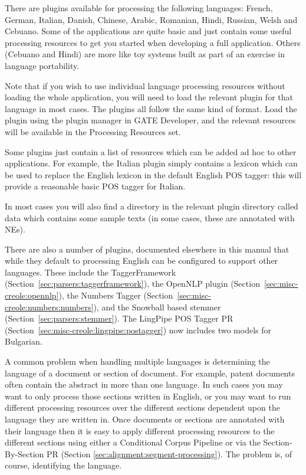 
\nnormalsize

There are plugins available for processing the following languages:
French, German, Italian, Danish, Chinese, Arabic, Romanian, Hindi, Russian,
Welsh and Cebuano. Some of the applications are quite basic and just contain
some useful processing resources to get you started when developing a full
application. Others (Cebuano and Hindi) are more like toy systems built as
part of an exercise in language portability.

Note that if you wish to use individual language processing resources
without loading the whole application, you will need to load the
relevant plugin for that language in most cases. The plugins all
follow the same kind of format. Load the plugin using the plugin
manager in GATE Developer, and the relevant resources will be
available in the Processing Resources set.

Some plugins just contain a list of resources which can be added ad
hoc to other applications. For example, the Italian plugin simply
contains a lexicon which can be used to replace the English lexicon in
the default English POS tagger: this will provide a reasonable basic
POS tagger for Italian.

In most cases you will also find a directory in the relevant plugin
directory called data which contains some sample texts (in some cases,
these are annotated with NEs).

There are also a number of plugins, documented elsewhere in this manual that
while they default to processing English can be configured to support other
languages. These include the TaggerFramework
(Section~\ref{sec:parsers:taggerframework}), the OpenNLP plugin
(Section~\ref{sec:misc-creole:opennlp}), the Numbers Tagger
(Section~\ref{sec:misc-creole:numbers:numbers}), and the Snowball based stemmer
(Section~\ref{sec:parsers:stemmer}).  The LingPipe POS Tagger PR
(Section~\ref{sec:misc-creole:lingpipe:postagger}) now includes two models for
Bulgarian.


A common problem when handling multiple languages is determining the language of a
document or section of document. For example, patent documents often contain
the abstract in more than one language. In such cases you may want
to only process those sections written in English, or you may want to
run different processing resources over the different sections dependent upon
the language they are written in. Once documents or sections are annotated with
their language then it is easy to apply different processing resources to the
different sections using either a Conditional Corpus Pipeline or via the
Section-By-Section PR (Section \ref{sec:alignment:segment-processing}).
The problem is, of course, identifying the language.

